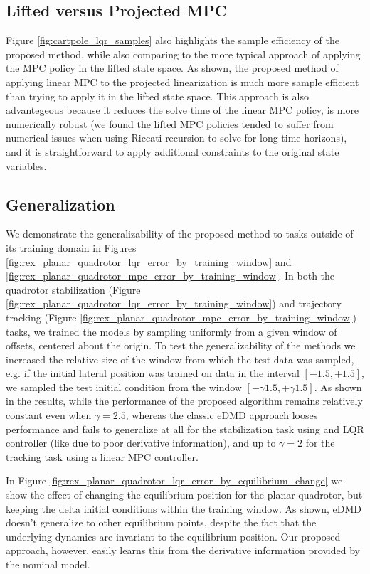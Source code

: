 \documentclass{article}
\begin{document}
\subsection{Lifted versus Projected MPC}
Figure \ref{fig:cartpole_lqr_samples} also highlights the sample efficiency of the proposed 
method, while also comparing to the more typical approach of applying the MPC policy in the 
lifted state space. As shown, the proposed method of applying linear MPC to the projected 
linearization is much more sample efficient than trying to apply it in the lifted state 
space. This approach is also advantegeous because it reduces the solve time of the linear 
MPC policy, is more numerically robust (we found the lifted MPC policies tended to suffer 
from numerical issues when using Riccati recursion to solve for long time horizons), and 
it is straightforward to apply additional constraints to the original state variables.

\subsection{Generalization}
We demonstrate the generalizability of the proposed method to tasks outside of its training
domain in Figures \ref{fig:rex_planar_quadrotor_lqr_error_by_training_window} and 
\ref{fig:rex_planar_quadrotor_mpc_error_by_training_window}. In both the quadrotor 
stabilization (Figure \ref{fig:rex_planar_quadrotor_lqr_error_by_training_window}) and 
trajectory tracking (Figure \ref{fig:rex_planar_quadrotor_mpc_error_by_training_window})
tasks, we trained the models by sampling uniformly from a given window of offsets, centered 
about the origin. 
To test the generalizability of the methods we increased the relative size of the window 
from which the test data was sampled, e.g. if the initial lateral position was trained on 
data in the interval $[-1.5,+1.5]$, we sampled the test initial condition from the window 
$[-\gamma 1.5, +\gamma 1.5]$. As shown in the results, while the performance of the proposed
algorithm remains relatively constant even when $\gamma = 2.5$, whereas the classic eDMD 
approach looses performance and fails to generalize at all for the stabilization task using 
and LQR controller (like due to poor derivative information), and up to $\gamma = 2$ for the 
tracking task using a linear MPC controller.

In Figure \ref{fig:rex_planar_quadrotor_lqr_error_by_equilibrium_change} we show the effect 
of changing the equilibrium position for the planar quadrotor, but keeping the delta initial
conditions within the training window. As shown, eDMD doesn't generalize to other
equilibrium points, despite the fact that the underlying dynamics are invariant to the
equilibrium position. Our proposed approach, however, easily learns this from the derivative
information provided by the nominal model.
\end{document}
